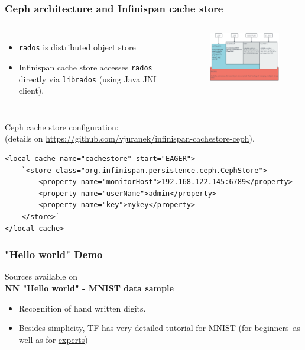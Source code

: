 \documentclass[10pt,utf8]{beamer}
\begin{document}
\begin{frame}[fragile]
	\frametitle{Ceph architecture and Infinispan cache store}
	\vspace{-0.5cm}
	\begin{columns}
	\begin{itemize}
		\item \texttt{rados} is distributed object store 
		\item Infinispan cache store accesses \texttt{rados} directly via \texttt{librados} (using Java JNI client).
	\end{itemize}
		\begin{figure}
			\centering
			\includegraphics[width=6cm]{./img/ceph_arch.eps}
		\end{figure}
	\end{columns}
	\vspace{-0.3cm}
	Ceph cache store configuration:\\
	(details on \color{blue}\href{https://github.com/vjuranek/infinispan-cachestore-ceph}{https://github.com/vjuranek/infinispan-cachestore-ceph}\color{black}).
	\begin{lstlisting}[style=XML]
<local-cache name="cachestore" start="EAGER">
    `<store class="org.infinispan.persistence.ceph.CephStore">
        <property name="monitorHost">192.168.122.145:6789</property>
        <property name="userName">admin</property>
        <property name="key">mykey</property>
    </store>`
</local-cache>
	\end{lstlisting}
\end{frame}


\begin{frame}
	\frametitle{"Hello world" Demo}
	\centering
	Sources available on \textbf{} \\
	\vspace{1cm}
	\Large\textbf{NN "Hello world" - MNIST data sample}
	\normalsize
	\vspace{0.5cm}
	\begin{itemize}
		\pause
		\item Recognition of hand written digits.
		\pause
		\item Besides simplicity, TF has very detailed tutorial for MNIST (for \color{blue}\href{https://www.tensorflow.org/tutorials/mnist/beginners/}{beginners}\color{black}~as 
		well as for \color{blue}\href{https://www.tensorflow.org/tutorials/mnist/pros/}{experts}\color{black})
	\end{itemize}
\end{frame}
\end{document}
